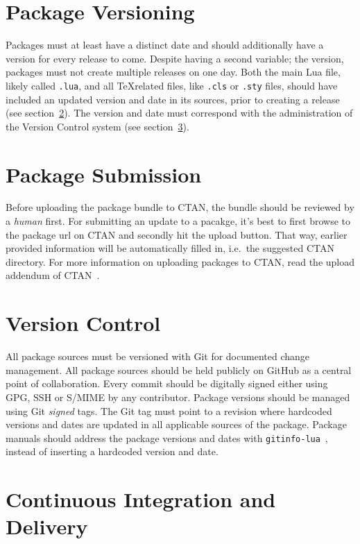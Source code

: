 \documentclass{xdpdoc}
\begin{document}
    \section{Package Versioning}

    Packages must at least have a distinct date and should additionally have a version for every release to come.
    Despite having a second variable; the version, packages must not create multiple releases on one day.
    Both the main Lua file, likely called \texttt{.lua}, and all \TeX related files, like \texttt{.cls} or \texttt{.sty} files, should have included an updated version and date in its sources, prior to creating a release (see section~\ref{sec:submission}).
    The version and date must correspond with the administration of the Version Control system (see section~\ref{sec:git}).


    \section{Package Submission}\label{sec:submission}

    Before uploading the package bundle to CTAN, the bundle should be reviewed by a \textit{human} first.
    For submitting an update to a pacakge, it's best to first browse to the package url on CTAN and secondly hit the upload button.
    That way, earlier provided information will be automatically filled in, i.e.\ the suggested CTAN directory.
    For more information on uploading packages to CTAN, read the upload addendum of CTAN~\cite{ctan:help:addendum}.


    \section{Version Control}\label{sec:git}

    All package sources must be versioned with Git for documented change management.
    All package sources should be held publicly on GitHub as a central point of collaboration.
    Every commit should be digitally signed either using GPG, SSH or S/MIME by any contributor.
    Package versions should be managed using Git \textit{signed} tags.
    The Git tag must point to a revision where hardcoded versions and dates are updated in all applicable sources of the package.
    Package manuals should address the package versions and dates with \texttt{gitinfo-lua}~\cite{gitinfo-lua}, instead of inserting a hardcoded version and date.


    \section{Continuous Integration and Delivery}
\end{document}
